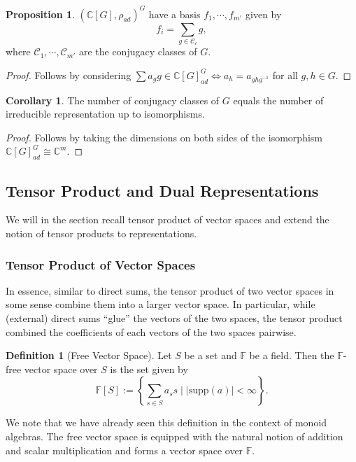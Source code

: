 \documentclass[]{article}
\theoremstyle{definition}
\newtheorem{corollary}{Corollary}[theorem]
\theoremstyle{definition}
\newtheorem{definition}{Definition}[section]
\newtheorem{proposition}{Proposition}[section]
\begin{document}
\begin{proposition}
  \((\mathbb{C}[G], \rho_{ad})^G\) have a basis \(f_1, \cdots, f_{m'}\) given 
  by 
  \[f_i = \sum_{g \in \mathcal{C_i}}g,\]
  where \(\mathcal{C}_1, \cdots, \mathcal{C}_{m'}\) are the conjugacy classes 
  of \(G\).
\end{proposition}
\begin{proof}
  Follows by considering \(\sum a_g g \in \mathbb{C}[G]_{ad}^G \iff a_h = a_{ghg^{-1}}\) 
  for all \(g, h \in G\).
\end{proof}

\begin{corollary}
  The number of conjugacy classes of \(G\) equals the number of irreducible 
  representation up to isomorphisms.
\end{corollary}
\begin{proof}
  Follows by taking the dimensions on both sides of the isomorphism 
  \(\mathbb{C}[G]_{ad}^G \cong \mathbb{C}^m\).
\end{proof}

\subsection{Tensor Product and Dual Representations}

We will in the section recall tensor product of vector spaces and extend the 
notion of tensor products to representations.

\subsubsection{Tensor Product of Vector Spaces}

In essence, similar to direct sums, the tensor product of two vector spaces 
in some sense combine them into a larger vector space. In particular, 
while (external) direct sums ``glue'' the vectors of the two spaces, the tensor 
product combined the coefficients of each vectors of the two spaces pairwise.

\begin{definition}[Free Vector Space]
  Let \(S\) be a set and \(\mathbb{F}\) be a field. Then the 
  \(\mathbb{F}\)-free vector space over \(S\) is the set given by 
  \[\mathbb{F}[S] := \left\{ \sum_{s \in S} a_s s \mid 
    |\text{supp}(a)| < \infty \right\}.\]
\end{definition}
We note that we have already seen this definition in the context of monoid 
algebras. The free vector space is equipped with the natural notion of 
addition and scalar multiplication and forms a vector space over \(\mathbb{F}\).
\end{document}
